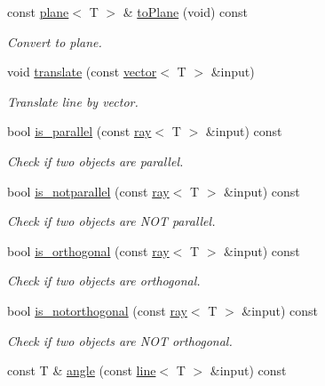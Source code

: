 \begin{DoxyCompactItemize}
\mbox{\label{classddd_1_1ray_a19f2040289cee7b67abe9520522909a5}} 
const \hyperlink{classddd_1_1plane}{plane}$<$ T $>$ \& \hyperlink{classddd_1_1ray_a19f2040289cee7b67abe9520522909a5}{to\+Plane} (void) const
\begin{DoxyCompactList}\small\item\em Convert to plane. \end{DoxyCompactList}\item 
void \hyperlink{classddd_1_1ray_a705a8f1ab49b183b03a42e097bd40649}{translate} (const \hyperlink{classddd_1_1vector}{vector}$<$ T $>$ \&input)
\begin{DoxyCompactList}\small\item\em Translate line by vector. \end{DoxyCompactList}\item 
bool \hyperlink{classddd_1_1ray_ac17fe4f977e57135cff60d1b152fafb9}{is\+\_\+parallel} (const \hyperlink{classddd_1_1ray}{ray}$<$ T $>$ \&input) const
\begin{DoxyCompactList}\small\item\em Check if two objects are parallel. \end{DoxyCompactList}\item 
bool \hyperlink{classddd_1_1ray_a71ecf77ee2921224588b6124f3ab30ab}{is\+\_\+notparallel} (const \hyperlink{classddd_1_1ray}{ray}$<$ T $>$ \&input) const
\begin{DoxyCompactList}\small\item\em Check if two objects are N\+OT parallel. \end{DoxyCompactList}\item 
bool \hyperlink{classddd_1_1ray_a669c71b72c7222adae9fab86795e7305}{is\+\_\+orthogonal} (const \hyperlink{classddd_1_1ray}{ray}$<$ T $>$ \&input) const
\begin{DoxyCompactList}\small\item\em Check if two objects are orthogonal. \end{DoxyCompactList}\item 
bool \hyperlink{classddd_1_1ray_aa0c53861b95ff86c12e9c0bcac935080}{is\+\_\+notorthogonal} (const \hyperlink{classddd_1_1ray}{ray}$<$ T $>$ \&input) const
\begin{DoxyCompactList}\small\item\em Check if two objects are N\+OT orthogonal. \end{DoxyCompactList}\item 
const T \& \hyperlink{classddd_1_1ray_a148b37b45554dbdffd57c5574ad3836f}{angle} (const \hyperlink{classddd_1_1line}{line}$<$ T $>$ \&input) const

\end{DoxyCompactItemize}
